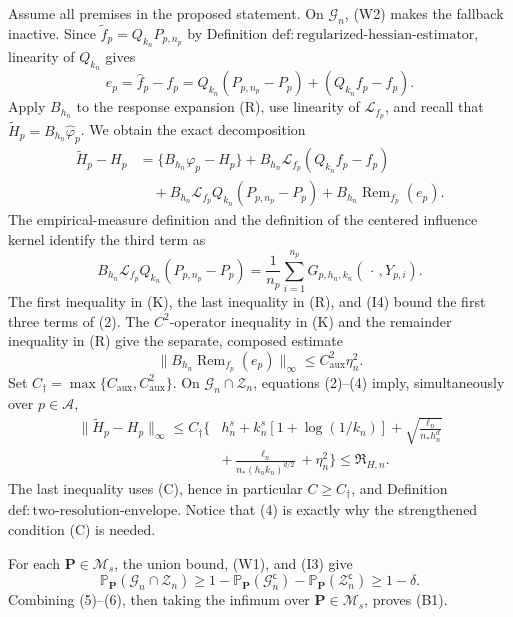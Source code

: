 Assume all premises in the proposed statement.  On \(\mathcal G_n\), (W2) makes the fallback inactive.  Since \(\widetilde f_p=Q_{k_n}P_{p,n_p}\) by Definition \(\mathrm{def:regularized\text{-}hessian\text{-}estimator}\), linearity of \(Q_{k_n}\) gives
\[
 e_p=\widehat f_p-f_p
 =Q_{k_n}(P_{p,n_p}-P_p)+(Q_{k_n}f_p-f_p).
 \tag{1}
\]
Apply \(B_{h_n}\) to the response expansion (R), use linearity of \(\mathscr L_{f_p}\), and recall that \(\widetilde H_p=B_{h_n}\widehat\varphi_p\).  We obtain the exact decomposition
\[
\begin{aligned}
 \widetilde H_p-H_p
 &=\{B_{h_n}\varphi_p-H_p\}
 +B_{h_n}\mathscr L_{f_p}(Q_{k_n}f_p-f_p)\\
 &\quad+B_{h_n}\mathscr L_{f_p}Q_{k_n}(P_{p,n_p}-P_p)
 +B_{h_n}\operatorname{Rem}_{f_p}(e_p).
\end{aligned}
 \tag{2}
\]
The empirical-measure definition and the definition of the centered influence kernel identify the third term as
\[
 B_{h_n}\mathscr L_{f_p}Q_{k_n}(P_{p,n_p}-P_p)
 =\frac1{n_p}\sum_{i=1}^{n_p}G_{p,h_n,k_n}(\,\cdot\,,Y_{p,i}).
 \tag{3}
\]
The first inequality in (K), the last inequality in (R), and (I4) bound the first three terms of (2).  The \(C^2\)-operator inequality in (K) and the remainder inequality in (R) give the separate, composed estimate
\[
 \lVert B_{h_n}\operatorname{Rem}_{f_p}(e_p)\rVert_\infty
 \le C_{\mathrm{aux}}^2\eta_n^2.
 \tag{4}
\]
Set \(C_\dagger=\max\{C_{\mathrm{aux}},C_{\mathrm{aux}}^2\}\).  On \(\mathcal G_n\cap\mathcal Z_n\), equations (2)--(4) imply, simultaneously over \(p\in\mathcal A\),
\[
\begin{aligned}
 \lVert\widetilde H_p-H_p\rVert_\infty
 \le C_\dagger\Bigg\{&h_n^s+k_n^s[1+\log(1/k_n)]
 +\sqrt{\frac{\ell_n}{n_\ast h_n^d}}\\
 &+\frac{\ell_n}{n_\ast(h_nk_n)^{d/2}}+\eta_n^2\Bigg\}
 \le\mathfrak R_{H,n}.
\end{aligned}
 \tag{5}
\]
The last inequality uses (C), hence in particular \(C\ge C_\dagger\), and Definition \(\mathrm{def:two\text{-}resolution\text{-}envelope}\).  Notice that (4) is exactly why the strengthened condition (C) is needed.

For each \(\mathbf P\in\mathcal M_s\), the union bound, (W1), and (I3) give
\[
 \mathbb P_{\mathbf P}(\mathcal G_n\cap\mathcal Z_n)
 \ge1-\mathbb P_{\mathbf P}(\mathcal G_n^{\mathsf c})
       -\mathbb P_{\mathbf P}(\mathcal Z_n^{\mathsf c})
 \ge1-\delta.
 \tag{6}
\]
Combining (5)--(6), then taking the infimum over \(\mathbf P\in\mathcal M_s\), proves (B1).

